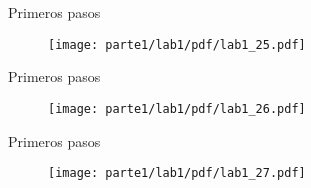 \begin{frame}{Primeros pasos }
\begin{figure}[H]
\centering
\texttt{[image: parte1/lab1/pdf/lab1\_25.pdf]}
\end{figure}
\end{frame}

\begin{frame}{Primeros pasos }
\begin{figure}[H]
\centering
\texttt{[image: parte1/lab1/pdf/lab1\_26.pdf]}
\end{figure}
\end{frame}

\begin{frame}{Primeros pasos }
\begin{figure}[H]
\centering
\texttt{[image: parte1/lab1/pdf/lab1\_27.pdf]}
\end{figure}
\end{frame}
